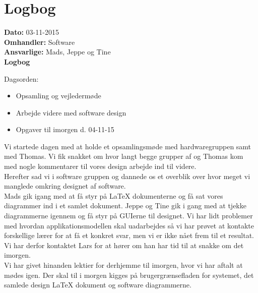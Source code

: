 \section{Logbog}

\textbf{Dato:} 03-11-2015 \\
\textbf{Omhandler:} Software \\
\textbf{Ansvarlige:} Mads, Jeppe og Tine \\
\textbf{Logbog}

Dagsorden:
\begin{itemize}
	\item Opsamling og vejledermøde
	\item Arbejde videre med software design
	\item Opgaver til imorgen d. 04-11-15 
\end{itemize}

Vi startede dagen med at holde et opsamlingsmøde med hardwaregruppen samt med Thomas. Vi fik snakket om hvor langt begge grupper af og Thomas kom med nogle kommentarer til vores design arbejde ind til videre.\\
Herefter sad vi i software gruppen og dannede os et overblik over hvor meget vi manglede omkring designet af software. \\
Mads gik igang med at få styr på LaTeX dokumenterne og få sat vores diagrammer ind i et samlet dokument. Jeppe og Tine gik i gang med at tjekke diagrammerne igennem og få styr på GUIerne til designet. Vi har lidt problemer med hvordan applikationsmodellen skal uadarbejdes så vi har prøvet at kontakte forskellige lærer for at få et konkret svar, men vi er ikke nået frem til et resultat. Vi har derfor kontaktet Lars for at hører om han har tid til at snakke om det imorgen.\\
Vi har givet hinanden lektier for derhjemme til imorgen, hvor vi har aftalt at mødes igen. Der skal til i morgen kigges på brugergrænsefladen for systemet, det samlede design LaTeX dokument og software diagrammerne.   
   
